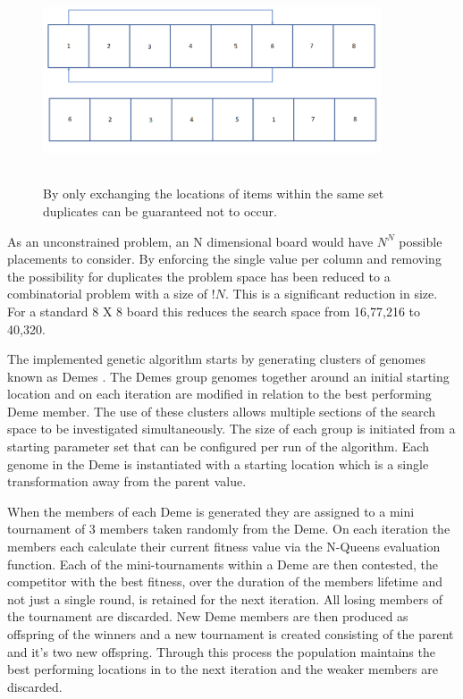 \documentclass[a4paper,onecolumn,11pt]{article}
\begin{document}
\begin{figure}[!htbp]
	\centering	
	\includegraphics[width=10cm, height=6cm]{SimpleCrossOver}
	\caption{By only exchanging the locations of items within the same set duplicates can be guaranteed not to occur.}
\end{figure}

As an unconstrained problem, an N dimensional board would have $N^N$ possible placements to consider. By enforcing the single value per column and removing the possibility for duplicates the problem space has been reduced to a combinatorial problem with a size of $!N$. This is a significant reduction in size. For a standard 8 X 8 board this reduces the search space from 16,77,216 to 40,320.

The implemented genetic algorithm starts by generating clusters of genomes known as Demes \cite{Demes}. The Demes group genomes together around an initial starting location and on each iteration are modified in relation to the best performing Deme member. The use of these clusters allows multiple sections of the search space to be investigated simultaneously. The size of each group is initiated from a starting parameter set that can be configured per run of the algorithm. Each genome in the Deme is instantiated with a starting location which is a single transformation away from the parent value. 

When the members of each Deme is generated they are assigned to a mini tournament of 3 members taken randomly from the Deme. On each iteration the members each calculate their current fitness value via the N-Queens evaluation function. Each of the mini-tournaments within a Deme are then contested, the competitor with the best fitness, over the duration of the members lifetime and not just a single round, is retained for the next iteration. All losing members of the tournament are discarded. New Deme members are then produced as offspring of the winners and a new tournament is created consisting of the parent and it's two new offspring. Through this process the population maintains the best performing locations in to the next iteration and the weaker members are discarded.
\end{document}
